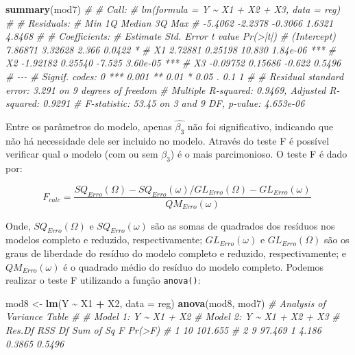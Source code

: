 \documentclass[
]{book}
\newenvironment{Shaded}{\begin{snugshade}}{\end{snugshade}}
\newcommand{\CommentTok}[1]{\textcolor[rgb]{0.56,0.35,0.01}{\textit{#1}}}
\newcommand{\DataTypeTok}[1]{\textcolor[rgb]{0.13,0.29,0.53}{#1}}
\newcommand{\KeywordTok}[1]{\textcolor[rgb]{0.13,0.29,0.53}{\textbf{#1}}}
\newcommand{\NormalTok}[1]{#1}
\newcommand{\OperatorTok}[1]{\textcolor[rgb]{0.81,0.36,0.00}{\textbf{#1}}}
\newcommand{\StringTok}[1]{\textcolor[rgb]{0.31,0.60,0.02}{#1}}
\numberwithin{equation}{section}
\newcommand{\indt}[1]{\index{#1|ST}}
\begin{document}
\begin{Shaded}
\begin{Highlighting}[]
\KeywordTok{summary}\NormalTok{(mod7)}
\CommentTok{\# }
\CommentTok{\# Call:}
\CommentTok{\# lm(formula = Y \textasciitilde{} X1 + X2 + X3, data = reg)}
\CommentTok{\# }
\CommentTok{\# Residuals:}
\CommentTok{\#     Min      1Q  Median      3Q     Max }
\CommentTok{\# {-}5.4062 {-}2.2378 {-}0.3066  1.6321  4.8468 }
\CommentTok{\# }
\CommentTok{\# Coefficients:}
\CommentTok{\#             Estimate Std. Error t value Pr(\textgreater{}|t|)    }
\CommentTok{\# (Intercept)  7.86871    3.32628   2.366   0.0422 *  }
\CommentTok{\# X1           2.72881    0.25198  10.830 1.84e{-}06 ***}
\CommentTok{\# X2          {-}1.92182    0.25540  {-}7.525 3.60e{-}05 ***}
\CommentTok{\# X3          {-}0.09752    0.15686  {-}0.622   0.5496    }
\CommentTok{\# {-}{-}{-}}
\CommentTok{\# Signif. codes:  0 \textquotesingle{}***\textquotesingle{} 0.001 \textquotesingle{}**\textquotesingle{} 0.01 \textquotesingle{}*\textquotesingle{} 0.05 \textquotesingle{}.\textquotesingle{} 0.1 \textquotesingle{} \textquotesingle{} 1}
\CommentTok{\# }
\CommentTok{\# Residual standard error: 3.291 on 9 degrees of freedom}
\CommentTok{\# Multiple R{-}squared:  0.9469,  Adjusted R{-}squared:  0.9291 }
\CommentTok{\# F{-}statistic: 53.45 on 3 and 9 DF,  p{-}value: 4.653e{-}06}
\end{Highlighting}
\end{Shaded}

Entre os parâmetros do modelo, apenas \(\hat{\beta_3}\) não foi significativo, indicando que não há necessidade dele ser incluido no modelo. Através do teste F é possível verificar qual o modelo (com ou sem \(\beta_3\)) é o mais parcimonioso. O teste F é dado por:

\[
F_{calc} = \frac{S{Q_{Erro}}(\Omega)- S{Q_{Erro}}(\omega)/G{L_{Erro}}(\Omega)- G{L_{Erro}}(\omega)} {Q{M_{Erro}}(\omega )}\
\]

Onde, \(SQ_{Erro}(\Omega)\) e \(SQ_{Erro}(\omega)\) são as somas de quadrados dos resíduos \indt{resíduos} nos modelos completo e reduzido, respectivamente; \(G{L_{Erro}}(\omega)\) e \(G{L_{Erro}}(\Omega)\) são os graus de liberdade do resíduo do modelo completo e reduzido, respectivamente; e \(Q{M_{Erro}}(\omega )\) é o quadrado médio do resíduo do modelo completo. Podemos realizar o teste F utilizando a função \texttt{anova()}:

\begin{Shaded}
\begin{Highlighting}[]
\NormalTok{mod8 \textless{}{-}}\StringTok{ }\KeywordTok{lm}\NormalTok{(Y }\OperatorTok{\textasciitilde{}}\StringTok{ }\NormalTok{X1 }\OperatorTok{+}\StringTok{ }\NormalTok{X2, }\DataTypeTok{data =}\NormalTok{ reg)}
\KeywordTok{anova}\NormalTok{(mod8, mod7)}
\CommentTok{\# Analysis of Variance Table}
\CommentTok{\# }
\CommentTok{\# Model 1: Y \textasciitilde{} X1 + X2}
\CommentTok{\# Model 2: Y \textasciitilde{} X1 + X2 + X3}
\CommentTok{\#   Res.Df     RSS Df Sum of Sq      F Pr(\textgreater{}F)}
\CommentTok{\# 1     10 101.655                           }
\CommentTok{\# 2      9  97.469  1     4.186 0.3865 0.5496}
\end{Highlighting}
\end{Shaded}
\end{document}
